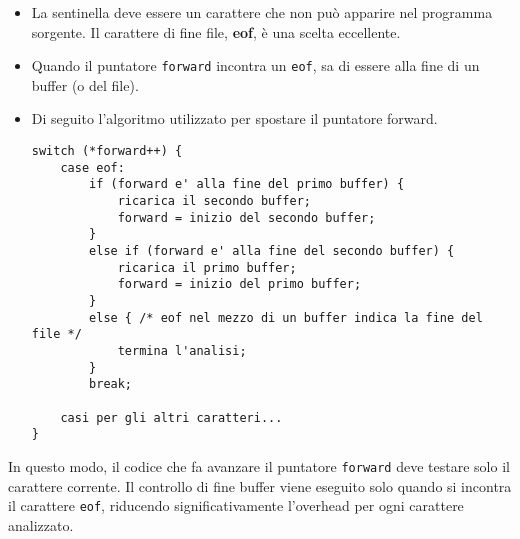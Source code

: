 \begin{itemize}
    \item La sentinella deve essere un carattere che non può apparire nel programma sorgente. Il carattere di fine file, \textbf{eof}, è una scelta eccellente.
    \item Quando il puntatore \texttt{forward} incontra un \texttt{eof}, sa di essere alla fine di un buffer (o del file).

    \item Di seguito l'algoritmo utilizzato per spostare il puntatore forward.
    
    \begin{Verbatim}[frame=single, label=Figura 3.5 - Pseudocodice per la lettura anticipata]
switch (*forward++) {
    case eof:
        if (forward e' alla fine del primo buffer) {
            ricarica il secondo buffer;
            forward = inizio del secondo buffer;
        }
        else if (forward e' alla fine del secondo buffer) {
            ricarica il primo buffer;
            forward = inizio del primo buffer;
        }
        else { /* eof nel mezzo di un buffer indica la fine del file */
            termina l'analisi;
        }
        break;

    casi per gli altri caratteri...
}
\end{Verbatim}
    
\end{itemize}

In questo modo, il codice che fa avanzare il puntatore \texttt{forward} deve testare solo il carattere corrente. Il controllo di fine buffer viene eseguito solo quando si incontra il carattere \texttt{eof}, riducendo significativamente l'overhead per ogni carattere analizzato.

\vspace{1 cm}
